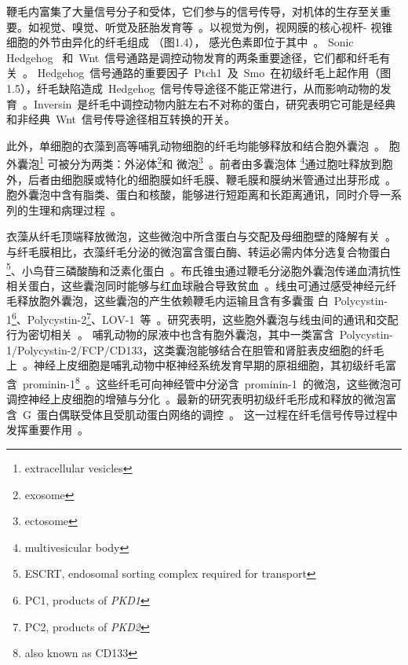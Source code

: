 鞭毛内富集了大量信号分子和受体，它们参与的信号传导，对机体的生存至关重要。如视觉、嗅觉、听觉及胚胎发育等\ \citep{Singla2006}。以视觉为例，视网膜的核心视杆- 视锥细胞的外节由异化的纤毛组成
（图1.4），
感光色素即位于其中\ \citep{Arden1979,Palczewski2006}。 Sonic Hedgehog
\ 和\ Wnt\
信号通路是调控动物发育的两条重要途径，它们都和纤毛有关\
\citep{Caspary2007,Dutta2015,Liu2014a}。 Hedgehog\ 信号通路的重要因子\ Ptch1\ 及\ Smo\ 在初级纤毛上起作用（图1.5），纤毛缺陷造成\ Hedgehog\ 信号传导途径不能正常进行，从而影响动物的发育\
\citep{Jiang2008,Liu2014a}。Inversin\ 是纤毛中调控动物内脏左右不对称的蛋白，研究表明它可能是经典和非经典\ Wnt\ 信号传导途径相互转换的开关。

此外，单细胞的衣藻到高等哺乳动物细胞的纤毛均能够释放和结合胞外囊泡\ \citep{Wood2015,Wang2016}。
胞外囊泡\footnote{extracellular vesicles} 可被分为两类：外泌体\footnote{exosome}和
微泡\footnote{ectosome}\ \citep{Cocucci2015,Gould2013}。前者由多囊泡体
\footnote{multivesicular body}通过胞吐释放到胞外，后者由细胞膜或特化的细胞膜如纤毛膜、鞭毛膜和膜纳米管通过出芽形成\ \citep{Cocucci2015,Gould2013}。胞外囊泡中含有脂类、蛋白和核酸，能够进行短距离和长距离通讯，同时介导一系列的生理和病理过程\ \citep{Raposo2013,E.L.Andaloussi2013}。

衣藻从纤毛顶端释放微泡，这些微泡中所含蛋白与交配及母细胞壁的降解有关\
\citep{Wood2013,Wang2016,Wood2015,Cao2015}。与纤毛膜相比，衣藻纤毛分泌的微泡富含蛋白酶、转运必需内体分选复合物蛋白\footnote{ESCRT, endosomal sorting complex required for transport}、小鸟苷三磷酸酶和泛素化蛋白\ \citep{Long2016}。布氏锥虫通过鞭毛分泌胞外囊泡传递血清抗性相关蛋白，这些囊泡同时能够与红血球融合导致贫血\ \citep{Szempruch2016,Szempruch2016a}。线虫可通过感受神经元纤毛释放胞外囊泡，这些囊泡的产生依赖鞭毛内运输且含有多囊蛋
白\ Polycystin-1\footnote{PC1, products of \textit{PKD1}}、Polycystin-2\footnote{PC2, products of \textit{PKD2}}、LOV-1\ 等\
\citep{Wang2016,Maguire2015,Wang2014,OHagan2014}。研究表明，这些胞外囊泡与线虫间的通讯和交配行为密切相关\ \citep{Wang2015,Wang2016,Maguire2015,Wang2014,OHagan2014}。
哺乳动物的尿液中也含有胞外囊泡，其中一类富含\ Polycystin-1/Polycystin-2/FCP/CD133，这类囊泡能够结合在胆管和肾脏表皮细胞的纤毛上\ \citep{Hogan2009}。神经上皮细胞是哺乳动物中枢神经系统发育早期的原祖细胞，其初级纤毛富含\ prominin-1\footnote{also known as CD133}\ \citep{Dubreuil2007}。这些纤毛可向神经管中分泌含\ prominin-1\ 的微泡，这些微泡可调控神经上皮细胞的增殖与分化\ \citep{Dubreuil2007}。最新的研究表明初级纤毛形成和释放的微泡富含\ G\ 蛋白偶联受体且受肌动蛋白网络的调控\ \citep{Nager2017}。 这一过程在纤毛信号传导过程中发挥重要作用\ \citep{Nager2017}。

